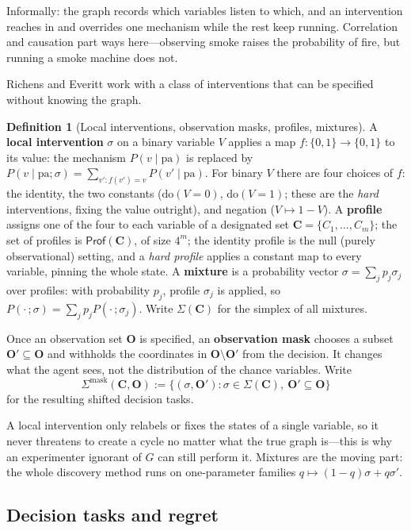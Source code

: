 \documentclass[11pt]{amsart}
\theoremstyle{plain}
\theoremstyle{definition}
\newtheorem{definition}[theorem]{Definition}
\newcommand{\bC}{\mathbf{C}}
\newcommand{\bO}{\mathbf{O}}
\newcommand{\Prof}{\mathsf{Prof}}
\begin{document}
Informally: the graph records which variables listen to which, and an intervention reaches in and overrides one mechanism while the rest keep running. Correlation and causation part ways here---observing smoke raises the probability of fire, but running a smoke machine does not.

Richens and Everitt work with a class of interventions that can be specified without knowing the graph.

\begin{definition}[Local interventions, observation masks, profiles, mixtures]\label{def:local}
A \textbf{local intervention} $\sigma$ on a binary variable $V$ applies a map $f\colon\{0,1\}\to\{0,1\}$ to its value: the mechanism $P(v\mid \mathrm{pa})$ is replaced by $P(v \mid \mathrm{pa};\sigma)=\sum_{v'\colon f(v')=v}P(v'\mid \mathrm{pa})$. For binary $V$ there are four choices of $f$: the identity, the two constants ($\mathrm{do}(V\!=\!0)$, $\mathrm{do}(V\!=\!1)$; these are the \emph{hard} interventions, fixing the value outright), and negation ($V\mapsto 1-V$). A \textbf{profile} assigns one of the four to each variable of a designated set $\bC=\{C_1,\dots,C_m\}$; the set of profiles is $\Prof(\bC)$, of size $4^{m}$; the identity profile is the null (purely observational) setting, and a \emph{hard profile} applies a constant map to every variable, pinning the whole state. A \textbf{mixture} is a probability vector $\sigma=\sum_j p_j\sigma_j$ over profiles: with probability $p_j$, profile $\sigma_j$ is applied, so $P(\cdot\,;\sigma)=\sum_j p_j P(\cdot\,;\sigma_j)$. Write $\Sigma(\bC)$ for the simplex of all mixtures.

Once an observation set $\bO$ is specified, an \textbf{observation mask} chooses a subset $\bO'\subseteq\bO$ and withholds the coordinates in $\bO\setminus\bO'$ from the decision. It changes what the agent sees, not the distribution of the chance variables. Write
\[
   \Sigma^\mathrm{mask}(\bC,\bO)
   :=\{(\sigma,\bO'):\sigma\in\Sigma(\bC),\ \bO'\subseteq\bO\}
\]
for the resulting shifted decision tasks.
\end{definition}

A local intervention only relabels or fixes the states of a single variable, so it never threatens to create a cycle no matter what the true graph is---this is why an experimenter ignorant of $G$ can still perform it. Mixtures are the moving part: the whole discovery method runs on one-parameter families $q\mapsto (1-q)\sigma+q\sigma'$.

\subsection{Decision tasks and regret}\label{subsec:decision}
\end{document}
